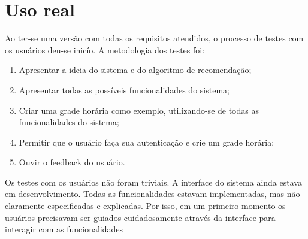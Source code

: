 \chapter{Uso real}
\label{cha:Uso real}

Ao ter-se uma versão com todas os requisitos atendidos, o processo de testes com os usuários deu-se inicío. A metodologia dos testes foi:

\begin{enumerate}
    \item Apresentar a ideia do sistema e do algoritmo de recomendação;
    \item Apresentar todas as possíveis funcionalidades do sistema;
    \item Criar uma grade horária como exemplo, utilizando-se de todas as funcionalidades do sistema;
    \item Permitir que o usuário faça sua autenticação e crie um grade horária;
    \item Ouvir o feedback do usuário.
\end{enumerate}

Os testes com os usuários não foram triviais. A interface do sistema ainda estava em desenvolvimento. Todas as funcionalidades estavam implementadas, mas não claramente especificadas e explicadas. Por isso, em um primeiro momento os usuários precisavam ser guiados cuidadosamente através da interface para interagir com as funcionalidades